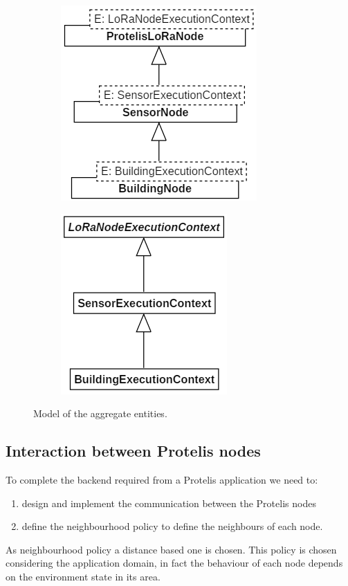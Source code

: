 \begin{figure}[h]
    \centering
    \begin{subfigure}{.495\textwidth}
        \centering
        \includegraphics{figures/NodeAC_caseStudy.png}
        \caption{}
        \label{fig:caseBmodel_a}
    \end{subfigure}
    \begin{subfigure}{.495\textwidth}
        \centering
        \includegraphics{figures/ECAC_caseStudy.png}
        \caption{}
        \label{fig:caseBmodel_b}
    \end{subfigure}
    \caption{Model of the aggregate entities.}
    \label{fig:caseBmodel}
\end{figure}
\subsection*{Interaction between Protelis nodes}
To complete the backend required from a Protelis application we need to:
\begin{enumerate}
    \item design and implement the communication between the Protelis nodes
    \item define the neighbourhood policy to define the neighbours of each node.
\end{enumerate}
As neighbourhood policy a distance based one is chosen. 
This policy is chosen considering the application domain, in fact the behaviour of each node depends on the environment state in its area. 

